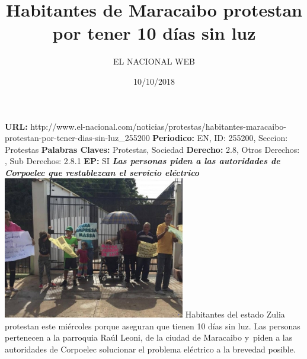 \documentclass{article}%
\title{\textbf{Habitantes de Maracaibo protestan por tener 10 días sin luz}}%
\author{EL NACIONAL WEB}%
\date{10/10/2018}%
\begin{document}
%
\normalsize%
\maketitle%
\textbf{URL: }%
http://www.el{-}nacional.com/noticias/protestas/habitantes{-}maracaibo{-}protestan{-}por{-}tener{-}dias{-}sin{-}luz\_255200\newline%
%
\textbf{Periodico: }%
EN, %
ID: %
255200, %
Seccion: %
Protestas\newline%
%
\textbf{Palabras Claves: }%
Protestas, Sociedad\newline%
%
\textbf{Derecho: }%
2.8, %
Otros Derechos: %
, %
Sub Derechos: %
2.8.1\newline%
%
\textbf{EP: }%
SI\newline%
\newline%
%
\textbf{\textit{Las personas piden a las autoridades de Corpoelec que restablezcan el servicio eléctrico~}}%
\newline%
\newline%
%
\includegraphics[width=300px]{18.jpg}%
\newline%
%
Habitantes del estado Zulia protestan este miércoles porque aseguran que tienen 10 días sin luz.%
\newline%
%
Las personas pertenecen a la parroquia Raúl Leoni, de la ciudad de Maracaibo y~piden a las autoridades de Corpoelec solucionar el problema eléctrico a la brevedad posible.%
\newline%
%
\end{document}
